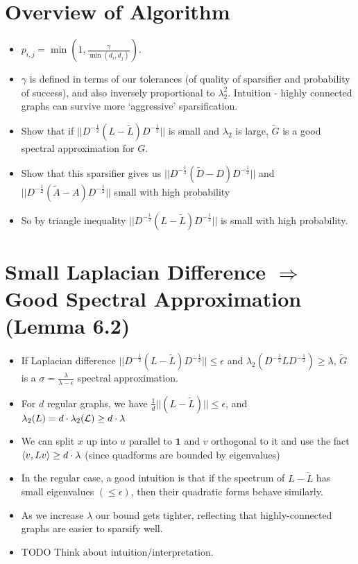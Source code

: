 \documentclass[11pt]{article}
\begin{document}
\section{Overview of Algorithm}
\label{sec:org0459e96}
\begin{itemize}
\item \(p_{i,j}=\min(1,\frac{\gamma}{\min(d_i,d_j)})\).
\item \(\gamma\) is defined in terms of our tolerances (of quality of sparsifier and probability of success), and also inversely proportional to \(\lambda_2^2\). Intuition - highly connected graphs can survive more `aggressive' sparsification.
\item Show that if \(||D^{-\frac12}(L-\tilde{L}) D^{-\frac12}||\) is small and \(\lambda_2\) is large, \(\tilde{G}\) is a good spectral approximation for \(G\).
\item Show that this sparsifier gives us \(||D^{-\frac12}(\tilde{D}-D)D^{-\frac12}||\) and \(||D^{-\frac12}(\tilde{A}-A)D^{-\frac12}||\) small with high probability
\item So by triangle inequality \(||D^{-\frac12}(L-\tilde{L}) D^{-\frac12}||\) is small with high probability.
\end{itemize}
\section{Small Laplacian Difference \(\Rightarrow\) Good Spectral Approximation (Lemma 6.2)}
\label{sec:orgf41375e}
\begin{itemize}
\item If Laplacian difference \(||D^{-\frac12}(L-\tilde{L}) D^{-\frac12}|| \le \epsilon\) and \(\lambda_2(D^{-\frac12}L D^{-\frac12}) \ge \lambda\), \(\tilde{G}\) is a \(\sigma = \frac{\lambda}{\lambda-\epsilon}\) spectral approximation.
\item For \(d\) regular graphs, we have \(\frac{1}{d}||(L-\tilde{L})|| \le \epsilon\), and \(\lambda_2(L)=d \cdot \lambda_2(\mathcal{L}) \ge d \cdot \lambda\)
\item We can split \(x\) up into \(u\) parallel to \(\textbf{1}\) and \(v\) orthogonal to it and use the fact \(\langle v , Lv \rangle \ge d \cdot \lambda\) (since quadforms are bounded by eigenvalues)
\item In the regular case, a good intuition is that if the spectrum of \(L-\tilde{L}\) has small eigenvalues \((\le \epsilon)\), then their quadratic forms behave similarly.
\item As we increase \(\lambda\) our bound gets tighter, reflecting that highly-connected graphs are easier to sparsify well.
\item TODO Think about intuition/interpretation.
\end{itemize}
\end{document}

